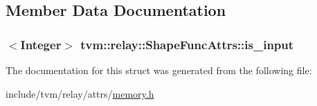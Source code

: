\subsection{Member Data Documentation}
\subsubsection[{\texorpdfstring{is\+\_\+input}{is_input}}]{$<${\bf Integer}$>$ tvm\+::relay\+::\+Shape\+Func\+Attrs\+::is\+\_\+input}\hypertarget{structtvm_1_1relay_1_1ShapeFuncAttrs_a1697a5a1b9e17876dd1a3db8a31264a5}{}\label{structtvm_1_1relay_1_1ShapeFuncAttrs_a1697a5a1b9e17876dd1a3db8a31264a5}


The documentation for this struct was generated from the following file\+:\begin{DoxyCompactItemize}
\item 
include/tvm/relay/attrs/\hyperlink{relay_2attrs_2memory_8h}{memory.\+h}\end{DoxyCompactItemize}
